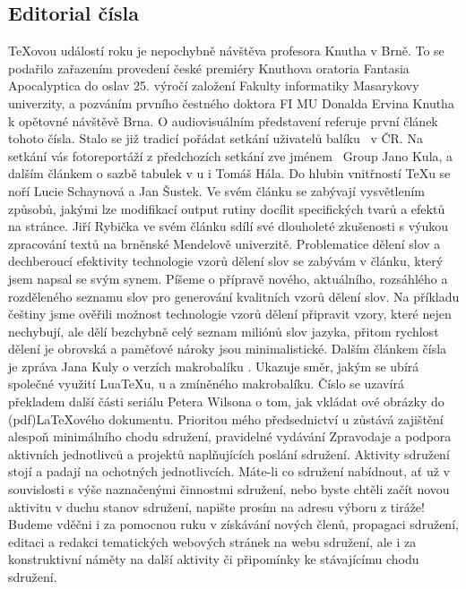 \subsection*{Editorial čísla}
\TeX ovou událostí roku je nepochybně návštěva profesora Knutha v Brně. To se podařilo zařazením provedení české premiéry Knuthova oratoria Fantasia Apocalyptica do oslav 25. výročí založení Fakulty informatiky Masarykovy univerzity, a pozváním prvního čestného doktora FI MU Donalda Ervina Knutha k opětovné návštěvě Brna.  O audiovisuálním představení referuje první článek tohoto čísla.
Stalo se již tradicí pořádat setkání uživatelů balíku \ConTeXt\ v ČR.  Na setkání vás fotoreportáží z předchozích setkání zve jménem \ConTeXt\ Group Jano Kula, a dalším článkem o sazbě tabulek v \ConTeXt u i Tomáš Hála.
Do hlubin vnitřností \TeX u se noří Lucie Schaynová a Jan Šustek.  Ve svém článku se zabývají vysvětlením způsobů, jakými lze modifikací output rutiny docílit specifických tvarů a efektů na stránce.
Jiří Rybička ve svém článku sdílí své dlouholeté zkušenosti s výukou zpracování textů na brněnské Mendelově univerzitě.
Problematice dělení slov a dechberoucí efektivity technologie vzorů dělení slov se zabývám v článku, který jsem napsal se svým synem.  Píšeme o přípravě nového, aktuálního, rozsáhlého a rozděleného seznamu slov pro generování kvalitních vzorů dělení slov.  Na příkladu češtiny jsme ověřili možnost technologie vzorů dělení připravit vzory, které nejen nechybují, ale dělí bezchybně celý seznam miliónů slov jazyka, přitom rychlost dělení je obrovská a paměťové nároky jsou minimalistické.
Dalším článkem čísla je zpráva Jana Kuly o verzích makrobalíku \ConTeXt.  Ukazuje směr, jakým se ubírá společné využití Lua\TeX u, \MP u a zmíněného makrobalíku.
Číslo se uzavírá překladem další části seriálu Petera Wilsona o tom, jak vkládat \MP ové obrázky do (pdf)\LaTeX ového dokumentu.
Prioritou mého předsednictví \CSTUG u zůstává zajištění alespoň minimálního chodu sdružení, pravidelné vydávání Zpravodaje a podpora aktivních jednotlivců a projektů naplňujících poslání sdružení.
Aktivity sdružení stojí a padají na ochotných jednotlivcích.  Máte-li co sdružení nabídnout, ať už v souvislosti s výše naznačenými činnostmi sdružení, nebo byste chtěli začít novou aktivitu v duchu stanov sdružení, napište prosím na adresu výboru z tiráže!
Budeme vděčni i za pomocnou ruku v získávání nových členů, propagaci sdružení, editaci a redakci tematických webových stránek na webu sdružení, ale i za konstruktivní náměty na další aktivity či připomínky ke stávajícímu chodu sdružení.
